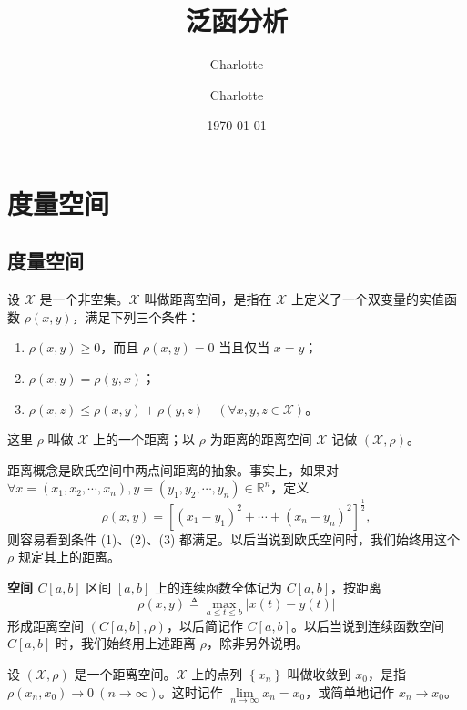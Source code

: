 \documentclass[lang=cn,newtx,10pt,scheme=chinese,thmcnt=chapter]{elegantbook}
\title{泛函分析}
\date{\today}
\author{Charlotte}
\author{Charlotte}
\begin{document}
\maketitle
\tableofcontents
\mainmatter
\chapter{度量空间}
\section{度量空间}
\begin{definition}
设 $\mathscr{X}$ 是一个非空集。$\mathscr{X}$ 叫做距离空间，是指在 $\mathscr{X}$ 上定义了一个双变量的实值函数 $\rho(x, y)$，满足下列三个条件：
\begin{enumerate}
    \item $\rho(x, y) \geqslant 0$，而且 $\rho(x, y)=0$ 当且仅当 $x=y$；
    \item $\rho(x, y)=\rho(y, x)$；
    \item $\rho(x, z) \leqslant \rho(x, y)+\rho(y, z) \quad (\forall x, y, z \in \mathscr{X})$。
\end{enumerate}
这里 $\rho$ 叫做 $\mathscr{X}$ 上的一个距离；以 $\rho$ 为距离的距离空间 $\mathscr{X}$ 记做 $(\mathscr{X}, \rho)$。
\end{definition}
\begin{note}距离概念是欧氏空间中两点间距离的抽象。事实上，如果对 $\forall x=\left(x_1, x_2, \cdots, x_n\right), y=\left(y_1, y_2, \cdots, y_n\right) \in \mathbb{R}^n$，定义
\begin{equation*}
\rho(x, y)=\left[\left(x_1-y_1\right)^2+\cdots+\left(x_n-y_n\right)^2\right]^{\frac{1}{2}} ,
\end{equation*}
则容易看到条件 (1)、(2)、(3) 都满足。以后当说到欧氏空间时，我们始终用这个 $\rho$ 规定其上的距离。
\end{note}


\begin{example}
\textbf{空间 $C[a, b]$} 区间 $[a, b]$ 上的连续函数全体记为 $C[a, b]$，按距离
\begin{equation*}
\rho(x, y) \triangleq \max _{a \leqslant t \leqslant b} |x(t)-y(t)|
\end{equation*}
形成距离空间 $(C[a, b], \rho)$，以后简记作 $C[a, b]$。以后当说到连续函数空间 $C[a, b]$ 时，我们始终用上述距离 $\rho$，除非另外说明。
\end{example}

\begin{definition}
设 $(\mathscr{X}, \rho)$ 是一个距离空间。$\mathscr{X}$ 上的点列 $\left\{x_n\right\}$ 叫做收敛到 $x_0$，是指 $\rho\left(x_n, x_0\right) \rightarrow 0 \ (n \rightarrow \infty)$。这时记作 $\lim\limits _{n \rightarrow \infty} x_n=x_0$，或简单地记作 $x_n \rightarrow x_0$。

\end{definition}
\end{document}
